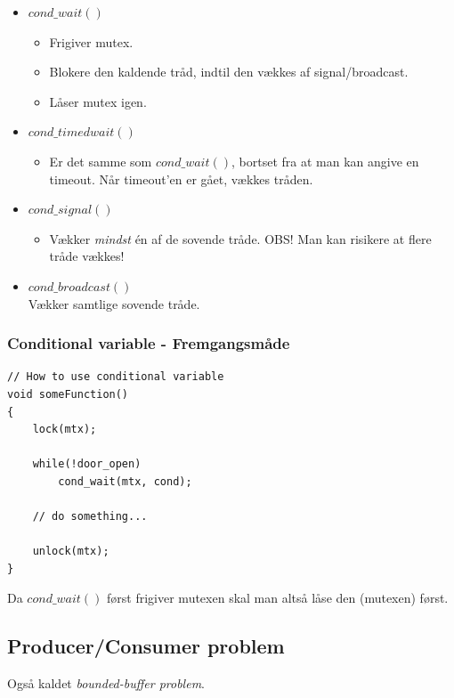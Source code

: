 \begin{itemize}
	\item $cond\_wait()$\\
	\begin{itemize}
		\item Frigiver mutex.
		\item Blokere den kaldende tråd, indtil den vækkes af signal/broadcast.
		\item Låser mutex igen.
	\end{itemize}
	\item $cond\_timedwait()$\\
	\begin{itemize}
		\item Er det samme som $cond\_wait()$, bortset fra at man kan angive en timeout. Når timeout'en er gået, vækkes tråden.
	\end{itemize}
	\item $cond\_signal()$\\
	\begin{itemize}
		\item Vækker \textit{mindst} én af de sovende tråde. OBS! Man kan risikere at flere tråde vækkes!
	\end{itemize}
	\item $cond\_broadcast()$\\
	Vækker samtlige sovende tråde.
\end{itemize}

\subsubsection{Conditional variable - Fremgangsmåde}

\begin{lstlisting}[otherkeywords={lock, unlock}]
// How to use conditional variable
void someFunction()
{
	lock(mtx);
	
	while(!door_open)
		cond_wait(mtx, cond);
		
	// do something...
	
	unlock(mtx);
}
\end{lstlisting}
Da $cond\_wait()$ først frigiver mutexen skal man altså låse den (mutexen) først.

\subsection{Producer/Consumer problem}
Også kaldet \textit{bounded-buffer problem}.\\

